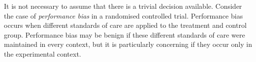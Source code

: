It is not necessary to assume that there is a trivial decision available. Consider the case of \emph{performance bias} in a randomised controlled trial. Performance bias occurs when different standards of care are applied to the treatment and control group\cite{collaboration_cochrane_nodate}. Performance bias may be benign if these different standards of care were maintained in every context, but it is particularly concerning if they occur only in the experimental context. 








